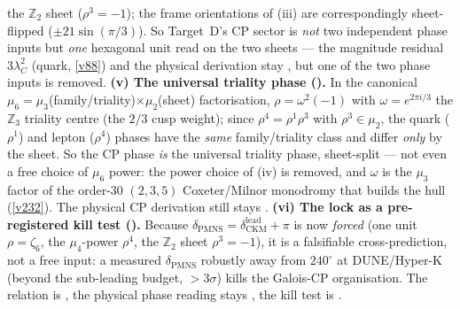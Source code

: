 \documentclass[11pt,a4paper]{article}
\providecommand{\Z}{\mathbb{Z}}
\begin{document}
\begin{winbox}
the $\Z_2$ sheet ($\rho^3=-1$); the frame orientations of (iii) are correspondingly sheet-flipped
($\pm21\sin(\pi/3)$). So Target~D's CP sector is \emph{not} two independent phase inputs but \emph{one}
hexagonal unit read on the two sheets --- the magnitude residual $3\lambda_C^2$ (quark, \vref{v88}) and the
physical derivation stay \mC, but one of the two phase inputs is removed. \textbf{(v) The universal triality
phase ().} In the canonical $\mu_6=\mu_3$(family/triality)$\times\mu_2$(sheet)
factorisation, $\rho=\omega^2(-1)$ with $\omega=e^{2\pi i/3}$ the $\Z_3$ triality centre (the $2/3$ cusp
weight); since $\rho^4=\rho^1\rho^3$ with $\rho^3\in\mu_2$, the quark ($\rho^1$) and lepton ($\rho^4$) phases
have the \emph{same} family/triality class and differ \emph{only} by the sheet. So the CP phase \emph{is} the
universal triality phase, sheet-split --- not even a free choice of $\mu_6$ power: the power choice of (iv)
is removed, and $\omega$ is the $\mu_3$ factor of the order-$30$ $(2,3,5)$ Coxeter/Milnor monodromy that
builds the hull (\vref{v232}). The physical CP derivation still stays \mC.
\textbf{(vi) The lock as a pre-registered kill test ().} Because
$\delta_{\mathrm{PMNS}}=\delta_{\mathrm{CKM}}^{\mathrm{lead}}+\pi$ is now \emph{forced} (one unit $\rho=\zeta_6$,
the $\mu_4$-power $\rho^4$, the $\Z_2$ sheet $\rho^3{=}-1$), it is a falsifiable cross-prediction, not a free
input: a measured $\delta_{\mathrm{PMNS}}$ robustly away from $240^\circ$ at DUNE/Hyper-K (beyond the sub-leading
budget, $>3\sigma$) kills the Galois-CP organisation. The relation is \mE, the physical phase reading stays \mC,
the kill test is \mX.
\end{winbox}
\end{document}
